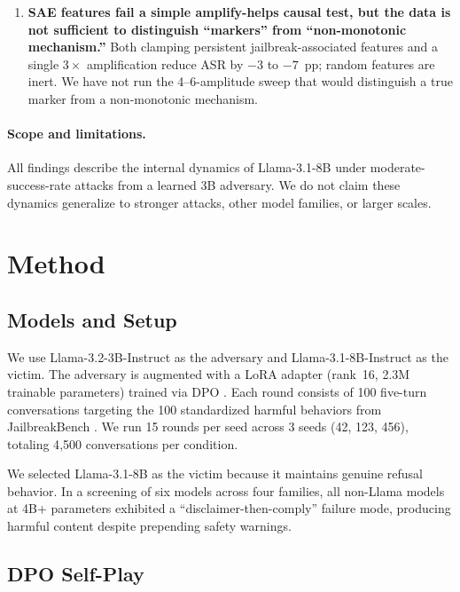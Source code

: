 \documentclass[11pt]{article}
\begin{document}
\begin{enumerate}[leftmargin=*]
  \item \textbf{SAE features fail a simple amplify-helps causal test, but the data is not sufficient to distinguish ``markers'' from ``non-monotonic mechanism.''} Both clamping persistent jailbreak-associated features and a single $3\times$ amplification reduce ASR by $-3$ to $-7$~pp; random features are inert. We have not run the 4--6-amplitude sweep that would distinguish a true marker from a non-monotonic mechanism.
\end{enumerate}

\paragraph{Scope and limitations.}
All findings describe the internal dynamics of Llama-3.1-8B under moderate-success-rate attacks from a learned 3B adversary.
We do not claim these dynamics generalize to stronger attacks, other model families, or larger scales.

\section{Method}
\label{sec:method}

\subsection{Models and Setup}

We use Llama-3.2-3B-Instruct as the adversary and Llama-3.1-8B-Instruct as the victim.
The adversary is augmented with a LoRA adapter (rank~16, 2.3M trainable parameters) trained via DPO \citep{rafailov2023dpo}.
Each round consists of 100 five-turn conversations targeting the 100 standardized harmful behaviors from JailbreakBench \citep{chao2024jailbreakbench}.
We run 15 rounds per seed across 3 seeds (42, 123, 456), totaling 4{,}500 conversations per condition.

We selected Llama-3.1-8B as the victim because it maintains genuine refusal behavior.
In a screening of six models across four families, all non-Llama models at 4B+ parameters exhibited a ``disclaimer-then-comply'' failure mode, producing harmful content despite prepending safety warnings.

\subsection{DPO Self-Play}
\end{document}
